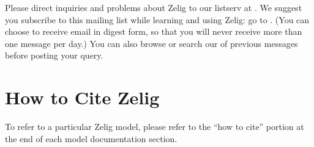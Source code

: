 \documentclass{article}
\begin{document}
Please direct inquiries and problems about Zelig to our listserv at
.  We
suggest you subscribe to this mailing list while learning and using
Zelig: go to .  (You can choose to receive email
in digest form, so that you will never receive more than one message
per day.)  You can also browse or search our
 of
previous messages before posting your query.

\section{How to Cite Zelig}

\CiteZelig

To refer to a particular Zelig model, please refer to the ``how to
cite'' portion at the end of each model documentation section.

\end{document}
